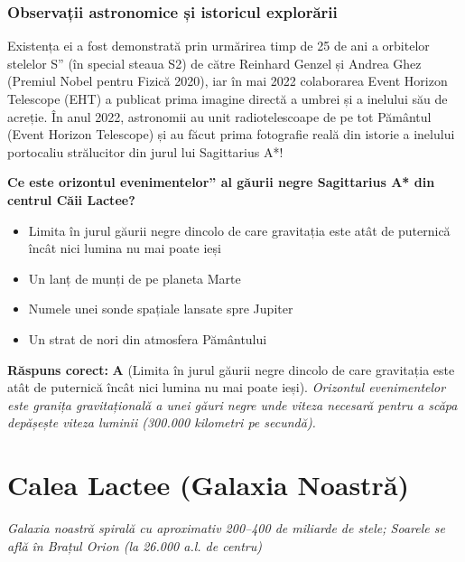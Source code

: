 \subsubsection*{Observații astronomice și istoricul explorării}
Existența ei a fost demonstrată prin urmărirea timp de 25 de ani a orbitelor stelelor \quotedblbase{}S\textquotedblright{} (în special steaua S2) de către Reinhard Genzel și Andrea Ghez (Premiul Nobel pentru Fizică 2020), iar în mai 2022 colaborarea Event Horizon Telescope (EHT) a publicat prima imagine directă a umbrei și a inelului său de acreție. În anul 2022, astronomii au unit radiotelescoape de pe tot Pământul (Event Horizon Telescope) și au făcut prima fotografie reală din istorie a inelului portocaliu strălucitor din jurul lui Sagittarius A*!

\vspace{6pt}
\begin{tcolorbox}[orbitarquiz, title={\textbf{Întrebare de verificare \#64: Sagittarius A* (Gaura Neagră Supermasivă)}}]
\textbf{Ce este \quotedblbase{}orizontul evenimentelor\textquotedblright{} al găurii negre Sagittarius A* din centrul Căii Lactee?}
\begin{itemize}[leftmargin=2.2em, itemsep=2pt, topsep=4pt]
  \item[$\square$ \textbf{A.}] Limita în jurul găurii negre dincolo de care gravitația este atât de puternică încât nici lumina nu mai poate ieși
  \item[$\square$ \textbf{B.}] Un lanț de munți de pe planeta Marte
  \item[$\square$ \textbf{C.}] Numele unei sonde spațiale lansate spre Jupiter
  \item[$\square$ \textbf{D.}] Un strat de nori din atmosfera Pământului
\end{itemize}
\vspace{2pt}
{\footnotesize\color{orbitarMuted}\textbf{Răspuns corect:} \textbf{A} (Limita în jurul găurii negre dincolo de care gravitația este atât de puternică încât nici lumina nu mai poate ieși). \emph{Orizontul evenimentelor este granița gravitațională a unei găuri negre unde viteza necesară pentru a scăpa depășește viteza luminii (300.000 kilometri pe secundă).}}
\end{tcolorbox}
\clearpage


\section{Calea Lactee (Galaxia Noastră)}
\label{sec:body-milky_way}
\vspace{-4pt}
{\large\itshape\color{orbitarAccent} Galaxia noastră spirală cu aproximativ 200--400 de miliarde de stele; Soarele se află în Brațul Orion (la 26.000 a.l. de centru)}\\[4pt]


